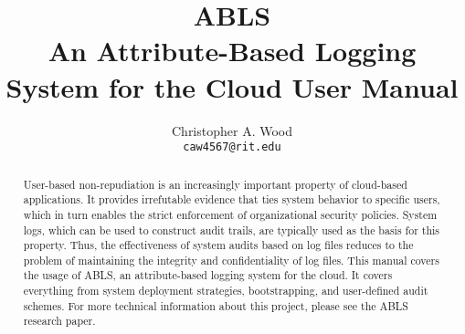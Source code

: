 \documentclass[a4paper,11pt]{report}
\begin{document}
\title{\textbf{ABLS} \\ An Attribute-Based Logging System for the Cloud {\small User Manual}}
\author{Christopher A. Wood \\ {\tt caw4567@rit.edu}}
\maketitle
\begin{abstract}\centering
User-based non-repudiation is an increasingly important property of cloud-based applications. It provides irrefutable evidence that ties system behavior to specific users, which in turn enables the strict enforcement of organizational security policies. System logs, which can be used to construct audit trails, are typically used as the basis for this property. Thus, the effectiveness of system audits based on log files reduces to the problem of maintaining the integrity and confidentiality of log files. This manual covers the usage of ABLS, an attribute-based logging system for the cloud. It covers everything from system deployment strategies, bootstrapping, and user-defined audit schemes. For more technical information about this project, please see the ABLS research paper. 
\end{abstract}
\tableofcontents

%
%
%
%
%
%

{}

\end{document}
